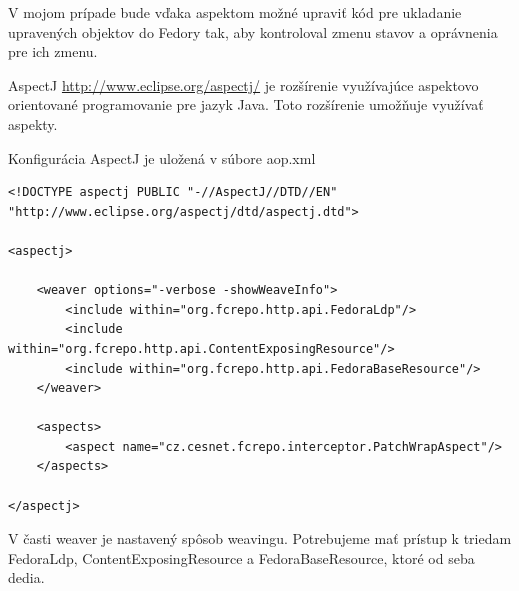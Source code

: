 \documentclass[thesis=M,slovak]{FITthesis}[2013/05/06]
\begin{document}
V mojom prípade bude vďaka aspektom možné upraviť kód pre ukladanie upravených objektov do Fedory tak, aby kontroloval zmenu stavov a oprávnenia pre ich zmenu.

AspectJ \url{http://www.eclipse.org/aspectj/} je rozšírenie využívajúce aspektovo orientované programovanie pre jazyk Java. Toto rozšírenie umožňuje využívať aspekty.

Konfigurácia AspectJ je uložená v súbore aop.xml
\lstset{language=XML}
\begin{lstlisting}[frame=single] 
<!DOCTYPE aspectj PUBLIC "-//AspectJ//DTD//EN" "http://www.eclipse.org/aspectj/dtd/aspectj.dtd">

<aspectj>

    <weaver options="-verbose -showWeaveInfo">
        <include within="org.fcrepo.http.api.FedoraLdp"/>
        <include within="org.fcrepo.http.api.ContentExposingResource"/>
        <include within="org.fcrepo.http.api.FedoraBaseResource"/>
    </weaver>

    <aspects>
        <aspect name="cz.cesnet.fcrepo.interceptor.PatchWrapAspect"/>
    </aspects>

</aspectj>
\end{lstlisting}
V časti weaver je nastavený spôsob weavingu. Potrebujeme mať prístup k triedam FedoraLdp, ContentExposingResource a FedoraBaseResource, ktoré od seba dedia.
\end{document}
